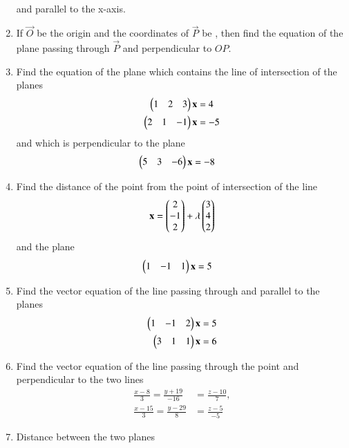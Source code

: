 \begin{enumerate}[label=\arabic*.,ref=\thesubsection.\theenumi]
\begin{align}
\end{align}
%
and parallel to the x-axis.
\item If $\vec{O}$ be the origin and the coordinates of $\vec{P}$ be , then find the equation of the plane passing through $\vec{P}$ and perpendicular to $OP$.
%
\item Find the equation of the plane which contains the line of intersection of the planes 
%
\begin{align}
\begin{pmatrix}1 & 2 & 3\end{pmatrix}\mathbf{x}&=4 
\\
\begin{pmatrix}2 & 1 & -1\end{pmatrix}\mathbf{x}&=-5
\end{align}
%
and which is perpendicular to the plane 
\begin{align}
\begin{pmatrix}5 & 3 & -6\end{pmatrix}\mathbf{x}&=-8
\end{align}
%
\item Find the distance of the point  from the point of intersection of the line
%
\begin{align}
\mathbf{x} = \begin{pmatrix}2 \\ -1 \\ 2\end{pmatrix} + \lambda \begin{pmatrix}3 \\ 4 \\ 2\end{pmatrix}  
\end{align}
%
and the plane
%
\begin{align}
\begin{pmatrix}1 & -1 & 1\end{pmatrix}\mathbf{x}&=5
\end{align}
%
\item Find the vector equation of the line passing through  and parallel to the planes 
%
\begin{align}
\begin{pmatrix}1 & -1 & 2\end{pmatrix}\mathbf{x}&=5
\\
\begin{pmatrix}3 & 1 & 1\end{pmatrix}\mathbf{x}&=6
\end{align}
%
\item Find the vector equation of the line passing through the point  and perpendicular to the two lines
\begin{align}
\frac{x-8}{3} = \frac{y+19}{-16} &= \frac{z-10}{7}, 
\\
\frac{x-15}{3} = \frac{y-29}{8} &= \frac{z-5}{-5} 
\end{align}
%
\item Distance between the two planes

\end{enumerate}
